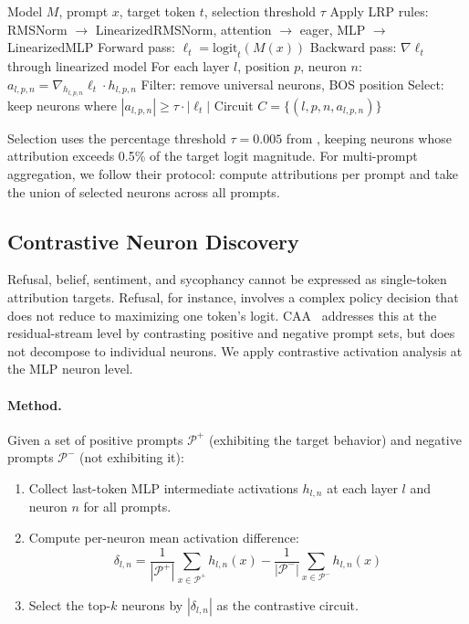 \documentclass[11pt]{article}
\begin{document}
\begin{algorithm}[h]
\caption{Neuron Circuit Discovery via RelP~\citep{arora2025circuits}}
\label{alg:discovery}
\begin{algorithmic}[1]
\REQUIRE Model $M$, prompt $x$, target token $t$, selection threshold $\tau$
\STATE Apply LRP rules: RMSNorm $\to$ LinearizedRMSNorm, attention $\to$ eager, MLP $\to$ LinearizedMLP
\STATE Forward pass: $\ell_t = \text{logit}_t(M(x))$
\STATE Backward pass: $\nabla \ell_t$ through linearized model
\STATE For each layer $l$, position $p$, neuron $n$: $a_{l,p,n} = \nabla_{h_{l,p,n}} \ell_t \cdot h_{l,p,n}$
\STATE Filter: remove universal neurons, BOS position
\STATE Select: keep neurons where $|a_{l,p,n}| \geq \tau \cdot |\ell_t|$
\RETURN Circuit $C = \{(l, p, n, a_{l,p,n})\}$
\end{algorithmic}
\end{algorithm}

\noindent
Selection uses the percentage threshold $\tau = 0.005$ from \citet{arora2025circuits}, keeping neurons whose attribution exceeds 0.5\% of the target logit magnitude.
For multi-prompt aggregation, we follow their protocol: compute attributions per prompt and take the union of selected neurons across all prompts.

\subsection{Contrastive Neuron Discovery}
\label{sec:contrastive}

Refusal, belief, sentiment, and sycophancy cannot be expressed as single-token attribution targets.
Refusal, for instance, involves a complex policy decision that does not reduce to maximizing one token's logit.
CAA~\citep{rimsky2024steering} addresses this at the residual-stream level by contrasting positive and negative prompt sets, but does not decompose to individual neurons.
We apply contrastive activation analysis at the MLP neuron level.

\paragraph{Method.}
Given a set of positive prompts $\mathcal{P}^+$ (exhibiting the target behavior) and negative prompts $\mathcal{P}^-$ (not exhibiting it):

\begin{enumerate}[leftmargin=2em]
    \item Collect last-token MLP intermediate activations $h_{l,n}$ at each layer $l$ and neuron $n$ for all prompts.
    \item Compute per-neuron mean activation difference:
    \begin{equation}
        \delta_{l,n} = \frac{1}{|\mathcal{P}^+|} \sum_{x \in \mathcal{P}^+} h_{l,n}(x) - \frac{1}{|\mathcal{P}^-|} \sum_{x \in \mathcal{P}^-} h_{l,n}(x)
        \label{eq:contrastive}
    \end{equation}
    \item Select the top-$k$ neurons by $|\delta_{l,n}|$ as the contrastive circuit.
\end{enumerate}
\end{document}
